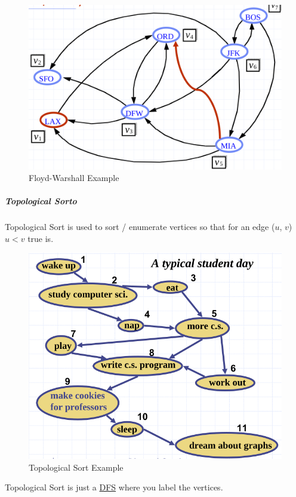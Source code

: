 \documentclass[11pt,twoside,twocolumn,landscape]{article}
\begin{document}
\begin{figure}[htbp]
\centering
\includegraphics[width=.9\linewidth]{img/floyd_warshall.png}
\caption{\label{fig:orgac73eb7}Floyd-Warshall Example}
\end{figure}

\subparagraph{Topological Sorto}
\label{sec:org1e29ddc}

Topological Sort is used to sort / enumerate vertices so that for an edge (\(u\), \(v\)) \(u < v\) true is.


\begin{figure}[htbp]
\centering
\includegraphics[width=.9\linewidth]{img/topological_sort_example.png}
\caption{\label{fig:orga3b8c18}Topological Sort Example}
\end{figure}


Topological Sort is just a \href{../../../roam/20220202095038-dfs.org}{DFS} where you label the vertices.
\end{document}

